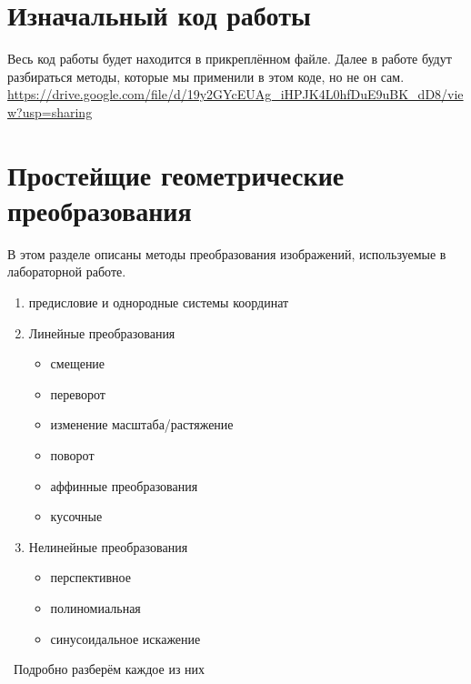 \documentclass[a4paper,12pt]{article}
\begin{document}
\section{Изначальный код работы}
Весь код работы будет находится в прикреплённом файле. Далее в работе будут разбираться методы, которые мы применили в этом коде, но не он сам.
\\
\url{https://drive.google.com/file/d/19y2GYcEUAg_iHPJK4L0hfDuE9uBK_dD8/view?usp=sharing}
\section{Простейщие геометрические преобразования}
В этом разделе описаны методы преобразования изображений, используемые в лабораторной работе.
\begin{enumerate}
    \item предисловие и однородные системы координат
    \item Линейные преобразования
    \begin{itemize}
        \item смещение
        \item переворот
        \item изменение масштаба/растяжение
        \item поворот
        \item аффинные преобразования
        \item кусочные
    \end{itemize}
    \item Нелинейные преобразования
      \begin{itemize}
        \item перспективное
        \item полиномиальная
        \item синусоидальное искажение
    \end{itemize}
\end{enumerate}
\
Подробно разберём каждое из них 
\end{document}
